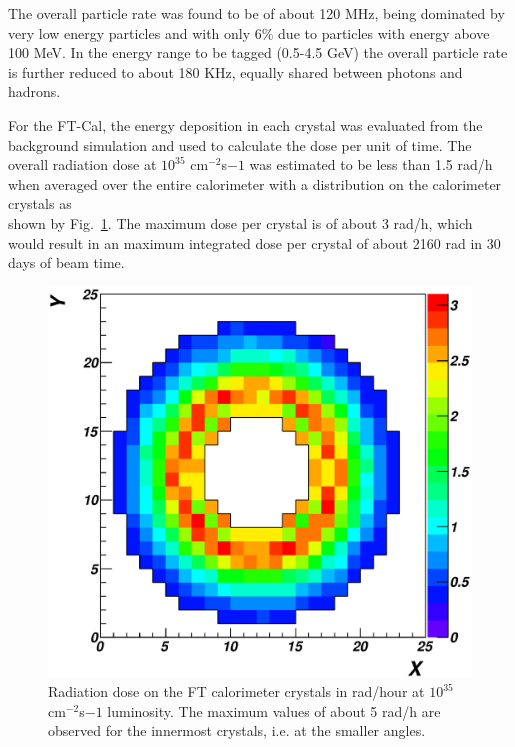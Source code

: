 The overall particle rate was found to be of about 120 MHz, being dominated by very low energy particles and with only 6\% due to particles with energy above 100 MeV. In the energy range to be tagged (0.5-4.5 GeV) the overall particle rate is further reduced to about 180 KHz, equally shared between photons and hadrons. 

For the FT-Cal, the energy deposition in each crystal was evaluated from the background simulation and used to calculate the dose per unit of time. The overall radiation dose at $10^{35}$ cm$^{-2}$s${-1}$ was estimated to be less than 1.5 rad/h when averaged over the entire calorimeter with a distribution on the calorimeter crystals as\\ shown by Fig.~\ref{fig:ft_rad}. The maximum dose per crystal is of about 3 rad/h, which would result in an maximum integrated dose per crystal of about 2160 rad in 30 days of beam time. 
\begin{figure}
\includegraphics[height=\columnwidth]{fig/ft_rad.eps}
\caption{Radiation dose on the FT calorimeter crystals in rad/hour at $10^{35}$ cm$^{-2}$s${-1}$ luminosity. The maximum values of about 5 rad/h are observed for the innermost crystals, i.e. at the smaller angles.}
\label{fig:ft_rad}
\end{figure}



